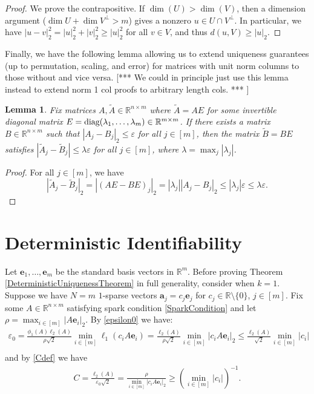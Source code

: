 \documentclass[journal, onecolumn]{IEEEtran}
\newtheorem{lemma}{Lemma}
\begin{document}
\begin{proof}
We prove the contrapositive.  If $\dim(U) > \dim(V)$, then a dimension argument ($\dim U + \dim V^\perp > m$) gives a nonzero $u \in U \cap V^\perp$.  In particular, we have $|u - v|_2^2 = |u|_2^2 + |v|_2^2 \geq |u|_2^2$ for all $v \in V$, and thus $d(u,V) \geq |u|_2$.
\end{proof}

Finally, we have the following lemma allowing us to extend uniqueness guarantees (up to permutation, scaling, and error) for matrices with unit norm columns to those without and vice versa.  [*** We could in principle just use this lemma instead to extend norm 1 col proofs to arbitrary length cols. *** ]
\begin{lemma}\label{NormalizedDictionaryLemma}
Fix matrices $A, \tilde{A} \in \mathbb{R}^{n \times m}$ where $\tilde{A} = AE$ for some invertible diagonal matrix $E = \text{\rm diag}(\lambda_1,\ldots,\lambda_m) \in \mathbb{R}^{m \times m}$. If there exists a matrix $B \in \mathbb{R}^{n \times m}$ such that $|A_j - B_j|_2 \leq \varepsilon$ for all $j \in [m]$, then the matrix $\tilde{B} = BE$ satisfies $|\tilde{A}_j - \tilde{B}_j| \leq \lambda \varepsilon$ for all $j \in [m]$, where $\lambda = \max_j |\lambda_j|$.
\end{lemma}
\begin{proof}
For all $j \in [m]$, we have
\[|\tilde{A}_j - \tilde{B}_j|_2 = |(AE-BE)_j|_2 = |\lambda_j| |A_j- B_j|_2 \leq |\lambda_j| \varepsilon \leq \lambda \varepsilon.\]
\end{proof}

 

\section{Deterministic Identifiability}\label{DUT}

Let $\mathbf{e}_1, \ldots, \mathbf{e}_m$ be the standard basis vectors in $\mathbb R^m$.
Before proving Theorem \ref{DeterministicUniquenessTheorem} in full generality, consider when $k=1$. Suppose we have $N = m$ $1$-sparse vectors $\mathbf{a}_j = c_j \mathbf{e}_j$ for $c_j \in \mathbb{R} \setminus \{0\}$, $j \in [m]$. Fix some $A \in \mathbb{R}^{n \times m}$ satisfying spark condition \eqref{SparkCondition} and let $\rho = \max_{i \in [m]} |A\mathbf{e}_i|_2$. By \eqref{epsilon0} we have:
\begin{align}
\varepsilon_0 
= \frac{ \phi_1(A) \ell_{2}(A) }{\rho \sqrt{2}} \min_{i \in [m]} \ell_1(c_iA\mathbf{e}_i) 
= \frac{\ell_2(A)}{ \rho \sqrt{2}} \min_{i \in [m]}|c_iA\mathbf{e}_i|_2
\leq \frac{\ell_2(A)}{ \sqrt{2}} \min_{i \in [m]}|c_i| \\
\end{align}
%
and by \eqref{Cdef} we have
\begin{align}
C = \frac{\ell_{2}(A)}{ \varepsilon_0 \sqrt{2}} = \frac{ \rho }{ \min_{i \in [m]} |c_iA\mathbf{e}_i|_2 }
\geq (\min_{i \in [m]} |c_i|)^{-1}. \\
\end{align} 
\end{document}
